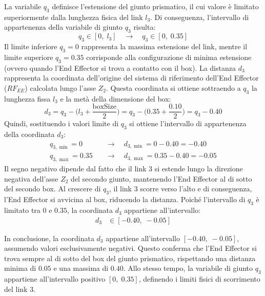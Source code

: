 ﻿\documentclass[11pt, a4paper]{article}
\begin{document}
La variabile $q_{3}$ definisce l'estensione del giunto prismatico, il cui valore è limitato superiormente dalla lunghezza fisica del link $l_3$. Di conseguenza, l'intervallo di appartenenza della variabile di giunto $q_3$ risulta:
\[
    q_3 \in [0, \; l_{3}] \quad\longrightarrow\quad q_{3} \in [0, \; 0.35]
\]
Il limite inferiore $q_3 = 0$ rappresenta la massima estensione del link, mentre il limite superiore $q_3 = 0.35$ corrisponde alla configurazione di minima estensione (ovvero quando l'End Effector si trova a contatto con il box). La distanza $d_{3}$ rappresenta la coordinata dell'origine del sistema di riferimento dell'End Effector ($RF_{EE}$) calcolata lungo l'asse $Z_{2}$. Questa coordinata si ottiene sottraendo a $q_3$ la lunghezza fissa $l_3$ e la metà della dimensione del box:
\[
    d_{3} = q_{3} - \biggl(l_3 + \frac{\text{boxSize}}{2}\biggr) = q_{3} - \biggl(0.35 + \frac{0.10}{2}\biggr) = q_{3} - 0.40
\]
Quindi, sostituendo i valori limite di $q_3$ si ottiene l'intervallo di appartenenza della coordinata $d_3$:
\begin{align*}
    q_{3, \min} = 0 &\quad\longrightarrow\quad d_{3, \min} = 0 - 0.40 = -0.40\\
    q_{3, \max} = 0.35 &\quad\longrightarrow\quad d_{3, \max} = 0.35 - 0.40 = -0.05
\end{align*}
Il segno negativo dipende dal fatto che il link 3 si estende lungo la direzione negativa dell'asse $Z_2$ del secondo giunto, mantenendo l'End Effector al di sotto del secondo box. Al crescere di $q_3$, il link 3 scorre verso l'alto e di conseguenza, l'End Effector si avvicina al box, riducendo la distanza. Poiché l'intervallo di $q_3$ è limitato tra $0$ e $0.35$, la coordinata $d_3$ appartiene all'intervallo:
\begin{align*}
    d_{3} &\in [-0.40, \; -0.05]
\end{align*}

In conclusione, la coordinata $d_3$ appartiene all'intervallo $[-0.40, \; -0.05]$, assumendo valori esclusivamente negativi. Questo conferma che l'End Effector si trova sempre al di sotto del box del giunto prismatico, rispettando una distanza minima di $0.05$ e una massima di $0.40$. Allo stesso tempo, la variabile di giunto $q_3$ appartiene all'intervallo positivo $[0, \; 0.35]$, definendo i limiti fisici di scorrimento del link 3.
\end{document}
